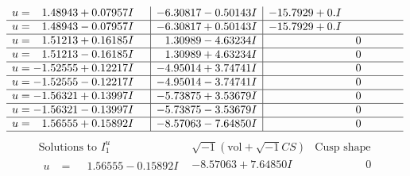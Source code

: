 \documentclass[1p]{elsarticle_modified}
\theoremstyle{definition}
\newcommand{\I}{\sqrt{-1}}
\begin{document}
$$\begin{array}{c|c|c}
\begin{aligned}
u &= \phantom{-}1.48943 + 0.07957 I\end{aligned}
 & -6.30817 - 0.50143 I & -15.7929 + 0. I\phantom{ +0.000000I} \\ \hline\begin{aligned}
u &= \phantom{-}1.48943 - 0.07957 I\end{aligned}
 & -6.30817 + 0.50143 I & -15.7929 + 0. I\phantom{ +0.000000I} \\ \hline\begin{aligned}
u &= \phantom{-}1.51213 + 0.16185 I\end{aligned}
 & \phantom{-}1.30989 - 4.63234 I & \phantom{-0.000000 } 0 \\ \hline\begin{aligned}
u &= \phantom{-}1.51213 - 0.16185 I\end{aligned}
 & \phantom{-}1.30989 + 4.63234 I & \phantom{-0.000000 } 0 \\ \hline\begin{aligned}
u &= -1.52555 + 0.12217 I\end{aligned}
 & -4.95014 + 3.74741 I & \phantom{-0.000000 } 0 \\ \hline\begin{aligned}
u &= -1.52555 - 0.12217 I\end{aligned}
 & -4.95014 - 3.74741 I & \phantom{-0.000000 } 0 \\ \hline\begin{aligned}
u &= -1.56321 + 0.13997 I\end{aligned}
 & -5.73875 + 3.53679 I & \phantom{-0.000000 } 0 \\ \hline\begin{aligned}
u &= -1.56321 - 0.13997 I\end{aligned}
 & -5.73875 - 3.53679 I & \phantom{-0.000000 } 0 \\ \hline\begin{aligned}
u &= \phantom{-}1.56555 + 0.15892 I\end{aligned}
 & -8.57063 - 7.64850 I & \phantom{-0.000000 } 0\\
 \hline 
 \end{array}$$\newpage$$\begin{array}{c|c|c}  
\text{Solutions to }I^u_{1}& \I (\text{vol} + \sqrt{-1}CS) & \text{Cusp shape}\\
 \hline 
\begin{aligned}
u &= \phantom{-}1.56555 - 0.15892 I\end{aligned}
 & -8.57063 + 7.64850 I & \phantom{-0.000000 } 0 \\ \hline\begin{aligned}

\end{aligned}
\end{array}$$
\end{document}
